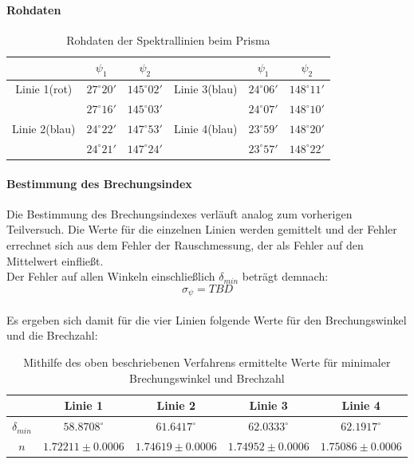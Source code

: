 \documentclass[12pt,a4paper]{article}
\begin{document}
\paragraph{Rohdaten}
\begin{table}
\begin{tabular}{|c|c|c||c|c|c|}
\hline 
 & $\psi_1$ & $\psi_2$ & & $\psi_1$ & $\psi_2$ \\ 
\hline 
Linie 1(rot) & $27^\circ 20'$ & $145^\circ 02'$ & Linie 3(blau) & $24^\circ 06'$ & $148^\circ 11'$\\ 
\hline 
 & $27^\circ 16'$ & $145^\circ 03'$& & $24^\circ 07'$ & $148^\circ 10'$\\
\hline
\hline 
\hline 
Linie 2(blau) & $24^\circ 22'$ & $147^\circ 53'$ & Linie 4(blau) & $23^\circ 59'$ & $148^\circ 20'$\\ 
\hline 
 & $24^\circ 21'$ & $147^\circ 24'$&  & $23^\circ 57'$ & $148^\circ 22'$\\ 
\hline 
\end{tabular} 
\caption{Rohdaten der Spektrallinien beim Prisma}
\end{table}

\paragraph{Bestimmung des Brechungsindex}
Die Bestimmung des Brechungsindexes verläuft analog zum vorherigen Teilversuch. Die Werte für die einzelnen Linien werden gemittelt und der Fehler errechnet sich aus dem Fehler der Rauschmessung, der als Fehler auf den Mittelwert einfließt.\\
Der Fehler auf allen Winkeln einschließlich $\delta_{min}$ beträgt demnach:
\begin{equation}
\sigma_{\psi} = TBD
\end{equation}
\\
Es ergeben sich damit für die vier Linien folgende Werte für den Brechungswinkel und die Brechzahl:
\begin{table}
\begin{tabular}{|c|c|c|c|c|}
\hline
 & Linie 1 & Linie 2 & Linie 3 & Linie 4\\
\hline
$\delta_{min}$ & $58.8708^\circ$ & $61.6417^\circ$ & $62.0333^\circ$ & $62.1917^\circ$\\
\hline
$n$ & $1.72211\pm 0.0006$ & $1.74619\pm 0.0006$ & $1.74952\pm 0.0006$ & $1.75086\pm 0.0006$\\
\hline
\end{tabular}
\caption{Mithilfe des oben beschriebenen Verfahrens ermittelte Werte für minimaler Brechungswinkel und Brechzahl}
\end{table}
\end{document}
